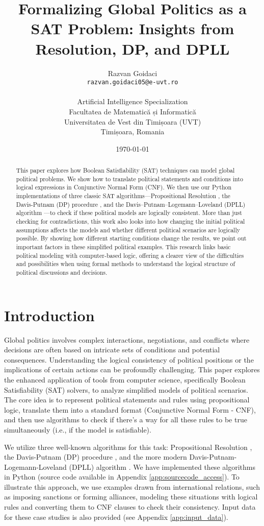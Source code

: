 \documentclass[11pt, a4paper]{article}
\title{Formalizing Global Politics as a SAT Problem: Insights from Resolution, DP, and DPLL}
\author{
    Razvan Goidaci \\
    \texttt{razvan.goidaci05@e-uvt.ro} \\ \\
    Artificial Intelligence Specialization \\
    Facultatea de Matematică și Informatică \\
    Universitatea de Vest din Timișoara (UVT) \\
    Timișoara, Romania
}
\date{\today}
\begin{document}
\maketitle

\begin{abstract}
This paper explores how Boolean Satisfiability (SAT) techniques can model global political problems. We show how to translate political statements and conditions into logical expressions in Conjunctive Normal Form (CNF). We then use our Python implementations of three classic SAT algorithms—Propositional Resolution \cite{Robinson1965}, the Davis-Putnam (DP) procedure \cite{DavisPutnam1960}, and the Davis–Putnam–Logemann–Loveland (DPLL) algorithm \cite{DPLL1962}—to check if these political models are logically consistent. More than just checking for contradictions, this work also looks into how changing the initial political assumptions affects the models and whether different political scenarios are logically possible. By showing how different starting conditions change the results, we point out important factors in these simplified political examples. This research links basic political modeling with computer-based logic, offering a clearer view of the difficulties and possibilities when using formal methods to understand the logical structure of political discussions and decisions.
\end{abstract}

\section{Introduction}

Global politics involves complex interactions, negotiations, and conflicts where decisions are often based on intricate sets of conditions and potential consequences. Understanding the logical consistency of political positions or the implications of certain actions can be profoundly challenging. This paper explores the enhanced application of tools from computer science, specifically Boolean Satisfiability (SAT) solvers, to analyze simplified models of political scenarios. The core idea is to represent political statements and rules using propositional logic, translate them into a standard format (Conjunctive Normal Form - CNF), and then use algorithms to check if there's a way for all these rules to be true simultaneously (i.e., if the model is satisfiable).

We utilize three well-known algorithms for this task: Propositional Resolution \cite{Robinson1965}, the Davis-Putnam (DP) procedure \cite{DavisPutnam1960}, and the more modern Davis-Putnam-Logemann-Loveland (DPLL) algorithm \cite{DPLL1962}. We have implemented these algorithms in Python (source code available in Appendix \ref{app:sourcecode_access}). To illustrate this approach, we use examples drawn from international relations, such as imposing sanctions or forming alliances, modeling these situations with logical rules and converting them to CNF clauses to check their consistency. Input data for these case studies is also provided (see Appendix \ref{app:input_data}).
\end{document}
